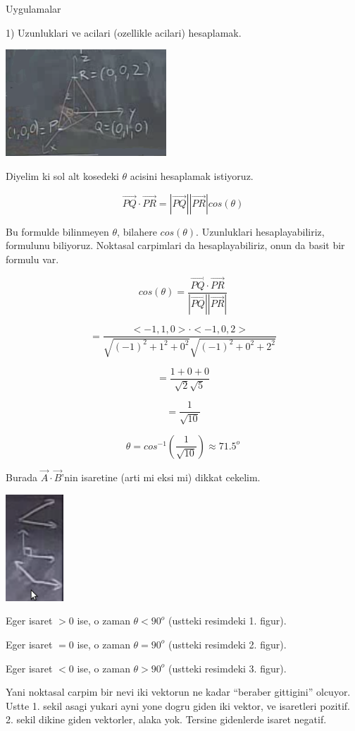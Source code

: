\documentclass[12pt,fleqn]{article}
\begin{document}
Uygulamalar

1) Uzunluklari ve acilari (ozellikle acilari) hesaplamak.

\includegraphics[height=4cm]{1_12.png}

Diyelim ki sol alt kosedeki $\theta$ acisini hesaplamak istiyoruz. 

\[ \vec{PQ} \cdot \vec{PR} = |\vec{PQ}||\vec{PR}|cos(\theta)  \]

Bu formulde bilinmeyen $\theta$, bilahere $cos(\theta)$. Uzunluklari
hesaplayabiliriz, formulunu biliyoruz. Noktasal carpimlari da
hesaplayabiliriz, onun da basit bir formulu var. 

\[ cos(\theta) = \frac{\vec{PQ} \cdot \vec{PR}}{|\vec{PQ}||\vec{PR}|}\]

\[ = \frac{<-1,1,0>\cdot<-1,0,2>}
{  \sqrt{(-1)^2+1^2+0^2 }\sqrt{(-1)^2+0^2+2^2 }   } 
\]

\[ = \frac{1+0+0}{\sqrt{2}\sqrt{5}}  \]

\[ = \frac{1}{\sqrt{10}} \]

\[ \theta = cos^{-1}(\frac{1}{\sqrt{10}}) \approx 71.5^o \]

Burada $\vec{A}\cdot\vec{B}$'nin isaretine (arti mi eksi mi) dikkat
cekelim. 

\includegraphics[height=4cm]{1_13.png}

Eger isaret $>0$ ise, o zaman $\theta < 90^o$ (ustteki resimdeki
1. figur). 

Eger isaret $=0$ ise, o zaman $\theta = 90^o$ (ustteki resimdeki
2. figur). 

Eger isaret $<0$ ise, o zaman $\theta > 90^o$ (ustteki resimdeki
3. figur). 

Yani noktasal carpim bir nevi iki vektorun ne kadar ``beraber gittigini''
olcuyor. Ustte 1. sekil asagi yukari ayni yone dogru giden iki vektor, ve
isaretleri pozitif. 2. sekil dikine giden vektorler, alaka yok. Tersine
gidenlerde isaret negatif. 
\end{document}
